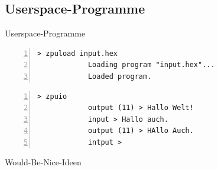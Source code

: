 \documentclass[10pt]{beamer}
\begin{document}
	\subsection{Userspace-Programme}
	
	\begin{frame}[fragile]{Userspace-Programme}
		\begin{lstlisting}[numbers=left,frame=single]
			> zpuload input.hex
			Loading program "input.hex"...
			Loaded program.
		\end{lstlisting}
		
		\begin{lstlisting}[numbers=left,frame=single]
			> zpuio
			output (11) > Hallo Welt!
			input > Hallo auch.
			output (11) > HAllo Auch.
			intput >
		\end{lstlisting}
	\end{frame}
	
	\begin{frame}{Would-Be-Nice-Ideen}
	
	\end{frame}
\end{document}
